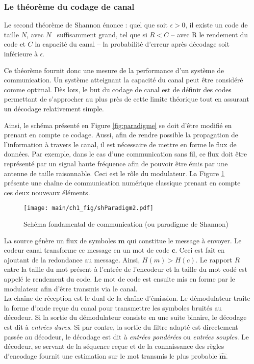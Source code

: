 \subsubsection{Le théorème du codage de canal}
Le second théorème de Shannon énonce : quel que soit $\epsilon > 0$, il existe un code de taille $N$, avec $N$ \
suffisamment grand, tel que si $R<C$ -- avec R le rendement du code et $C$ la capacité du canal -- la probabilité
d'erreur après décodage soit inférieure à $\epsilon$. 

Ce théorème fournit donc une mesure de la performance d'un système de communication. Un système atteignant la capacité 
du canal peut être considéré comme optimal. Dès lors, le but du codage de canal est de définir des codes permettant de 
s'approcher au plus près de cette limite théorique tout en assurant un décodage relativement simple.

Ainsi, le schéma présenté en Figure \ref{fig:paradigme} se doit d'être modifié en prenant en compte ce codage. Aussi,
afin de rendre possible la propagation de l'information à travers le canal, il est nécessaire de mettre en forme le flux 
de données. Par exemple, dans le cas d'une communication sans fil, ce flux doit être représenté par un signal haute 
fréquence afin de pouvoir être émis par une antenne de taille raisonnable. Ceci est le rôle du modulateur.
La Figure \ref{fig:paradigme2} présente une chaîne de communication numérique classique prenant en compte ces deux
nouveaux éléments.
\begin{figure}[!h]
	\centering
	\texttt{[image: main/ch1\_fig/shParadigm2.pdf]}
	\caption{\label{fig:paradigme2} Schéma fondamental de communication (ou paradigme de Shannon)}
\end{figure}

La source génère un flux de symboles $\mathbf{m}$ qui constitue le message à envoyer. Le codeur canal transforme ce message 
en un mot de code $\mathbf{c}$. Ceci est fait en ajoutant de la redondance au message. Ainsi, $H(m)>H(c)$. Le rapport $R$
entre la taille du mot présent à l'entrée de l'encodeur et la taille du mot codé est appelé le rendement du code. Le mot 
de code est ensuite mis en forme par le modulateur afin d'être transmis via le canal.\\
La chaîne de réception est le dual de la chaîne d’émission. Le démodulateur traite la forme d'onde reçue du canal 
pour transmettre les symboles bruités au décodeur. Si la sortie du démodulateur consiste en une suite binaire, le 
décodage est dit à \emph{entrées dures}. Si par contre, la sortie du filtre adapté est directement passée au décodeur, 
le décodage est dit à \emph{entrées pondérées} ou \emph{entrées souples}. Le décodeur, se servant de la séquence reçue et de la connaissance des règles 
d'encodage fournit une estimation sur le  mot transmis le plus probable $\mathbf{\hat{m}}$.


